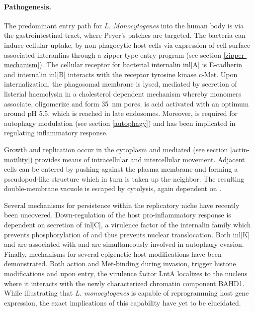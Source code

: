 \paragraph{Pathogenesis.}
The predominant entry path for \textit{L. Monocytogenes} into the human body is via the gastrointestinal tract, where Peyer's patches are targeted. The bacteria can induce cellular uptake, by non-phagocytic host cells via expression of cell-surface associated interanlins through a zipper-type entry program (see section \ref{zipper-mechanism}). The cellular receptor for bacterial internalin \acrshort{inl}[A] is E-cadherin and internalin \acrshort{inl}[B] interacts with the receptor tyrosine kinase c-Met. Upon internalization, the phagosomal membrane is lysed, mediated by secretion of listerial haemolysin  in a cholesterol dependent mechanism whereby  monomers associate, oligomerize and form \SI{35}{\nano\meter} pores.  is acid activated with an optimum around pH 5.5, which is reached in late endosomes. Moreover,  is required for autophagy modulation (see section \ref{autophagy}) and has been implicated in regulating inflammatory response.

Growth and replication occur in the cytoplasm and  mediated  (see section \ref{actin-motility}) provides means of intracellular and intercellular movement. Adjacent cells can be entered by pushing against the plasma membrane and forming a pseudopod-like structure which in turn is taken up the neighbor. The resulting double-membrane vacuole is escaped by cytolysis, again dependent on .

Several mechanisms for persistence within the replicatory niche have recently been uncovered. Down-regulation of the host pro-inflammatory response is dependent on secretion of \acrshort{inl}[C], a virulence factor of the internalin family which prevents phosphorylation of  and thus prevents nuclear translocation. Both \acrshort{inl}[K] and  are associated with  and are simultaneously involved in autophagy evasion. Finally, mechanisms for several epigenetic host modifications have been demonstrated. Both  action and Met-binding during invasion, trigger histone modifications and upon entry, the virulence factor LntA localizes to the nucleus where it interacts with the newly characterized chromatin component BAHD1. While illustrating that \textit{L. monocytogenes} is capable of reprogramming host gene expression, the exact implications of this capability have yet to be elucidated.

